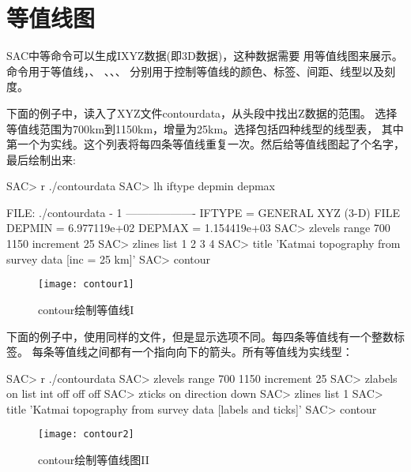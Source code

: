 \section{等值线图}
\label{sec:contour}
SAC中等命令可以生成IXYZ数据(即3D数据)，这种数据需要
用等值线图来展示。命令用于等值线，、
、、、
分别用于控制等值线的颜色、标签、间距、线型以及刻度。

下面的例子中，读入了XYZ文件contourdata，从头段中找出Z数据的范围。
选择等值线范围为700km到1150km，增量为25km。选择包括四种线型的线型表，
其中第一个为实线。这个列表将每四条等值线重复一次。然后给等值线图起了个名字，最后绘制出来:
\begin{SACCode}
SAC> r ./contourdata 
SAC> lh iftype depmin depmax
  
  FILE: ./contourdata - 1
 -------------------
       IFTYPE = GENERAL XYZ (3-D) FILE
       DEPMIN = 6.977119e+02
       DEPMAX = 1.154419e+03
SAC> zlevels range 700 1150 increment 25
SAC> zlines list 1 2 3 4
SAC> title 'Katmai topography from survey data [inc = 25 km]'
SAC> contour
\end{SACCode}

\begin{figure}[H]
\centering
\texttt{[image: contour1]}
\caption{contour绘制等值线I}
\end{figure}

下面的例子中，使用同样的文件，但是显示选项不同。每四条等值线有一个整数标签。
每条等值线之间都有一个指向向下的箭头。所有等值线为实线型：
\begin{SACCode}
SAC> r ./contourdata 
SAC> zlevels range 700 1150 increment 25
SAC> zlabels on list int off off off
SAC> zticks on direction down
SAC> zlines list 1
SAC> title 'Katmai topography from survey data [labels and ticks]'
SAC> contour
\end{SACCode}

\begin{figure}[H]
\centering
\texttt{[image: contour2]}
\caption{contour绘制等值线图II}
\end{figure}
